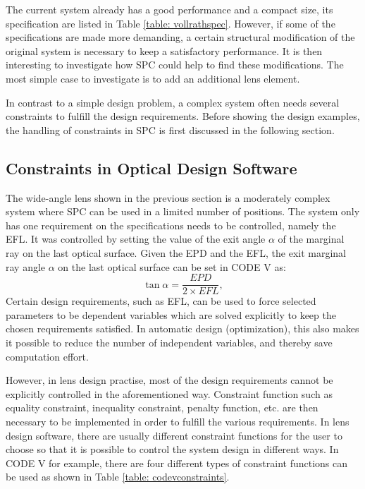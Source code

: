 The current system already has a good performance and a compact size, its specification are listed in Table \ref{table: vollrathspec}. However, if some of the specifications are made more demanding, a certain structural modification of the original system is necessary to keep a satisfactory performance. It is then interesting to investigate how SPC could help to find these modifications. The most simple case to investigate is to add an additional lens element. 

In contrast to a simple design problem, a complex system often needs several constraints to fulfill the design requirements. Before showing the design examples, the handling of constraints in SPC is first discussed in the following section.

\subsection{Constraints in Optical Design Software} \label{Constraints in optical design software}
The wide-angle lens shown in the previous section is a moderately complex system where SPC can be used in a limited number of positions. The system only has one requirement on the specifications needs to be controlled, namely the EFL. It was controlled by setting the value of the exit angle $\alpha$  of the marginal ray on the last optical surface. Given the EPD and the EFL, the exit marginal ray angle $\alpha$ on the last optical surface can be set in CODE V as:
\setlength{\belowdisplayshortskip}{5pt}
\setlength{\abovedisplayshortskip}{5pt}
\begin{equation} \label{eq:EFLsolve}
\tan\alpha = \frac{EPD}{2\times EFL},
\end{equation}
\noindent Certain design requirements, such as EFL, can be used to force selected parameters to be dependent variables which are solved explicitly to keep the chosen requirements satisfied. In automatic design (optimization), this also makes it possible to reduce the number of independent variables, and thereby save computation effort.

However, in lens design practise, most of the design requirements cannot be explicitly controlled in the  aforementioned way. Constraint function such as equality constraint, inequality constraint, penalty function, etc. are then necessary to be implemented in order to fulfill the various requirements. In lens design software, there are usually different constraint functions for the user to choose so that it is possible to control the system design in different ways. In CODE V for example, there are four different types of constraint functions can be used as shown in Table \ref{table: codevconstraints}.

